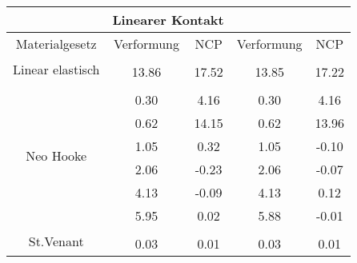 \begin{table} 
\centering 
\begin{tabular}{c|cc|cc|} 
\cline{2-5} 
 & \multicolumn{2}{|c|}{Linearer Kontakt} &  \\ 
\hline 
\multicolumn{1}{|c|}{Materialgesetz} & \multicolumn{1}{c|}{Verformung} & \multicolumn{1}{c|}{NCP} & \multicolumn{1}{c|}{Verformung} & \multicolumn{1}{c|}{NCP} \\ 
\hline 
\multicolumn{1}{|c|}{\multirow{2}{*}{Linear elastisch}} &\multicolumn{1}{|c|}{} & \multicolumn{1}{|c|}{} & \multicolumn{1}{|c|}{} & \multicolumn{1}{|c|}{} \\ 
\multicolumn{1}{|c|}{} & \multicolumn{1}{|c|}{     13.86} & \multicolumn{1}{|c|}{     17.52} & \multicolumn{1}{|c|}{     13.85} & \multicolumn{1}{|c|}{     17.22} \\ 
\hline 
\multicolumn{1}{|c|}{\multirow{7}{*}{Neo Hooke}} &\multicolumn{1}{|c|}{} & \multicolumn{1}{|c|}{} & \multicolumn{1}{|c|}{} & \multicolumn{1}{|c|}{} \\ 
\multicolumn{1}{|c|}{} & \multicolumn{1}{|c|}{      0.30} & \multicolumn{1}{|c|}{      4.16} & \multicolumn{1}{|c|}{      0.30} & \multicolumn{1}{|c|}{      4.16} \\ 
\multicolumn{1}{|c|}{} & \multicolumn{1}{|c|}{      0.62} & \multicolumn{1}{|c|}{     14.15} & \multicolumn{1}{|c|}{      0.62} & \multicolumn{1}{|c|}{     13.96} \\ 
\multicolumn{1}{|c|}{} & \multicolumn{1}{|c|}{      1.05} & \multicolumn{1}{|c|}{      0.32} & \multicolumn{1}{|c|}{      1.05} & \multicolumn{1}{|c|}{     -0.10} \\ 
\multicolumn{1}{|c|}{} & \multicolumn{1}{|c|}{      2.06} & \multicolumn{1}{|c|}{     -0.23} & \multicolumn{1}{|c|}{      2.06} & \multicolumn{1}{|c|}{     -0.07} \\ 
\multicolumn{1}{|c|}{} & \multicolumn{1}{|c|}{      4.13} & \multicolumn{1}{|c|}{     -0.09} & \multicolumn{1}{|c|}{      4.13} & \multicolumn{1}{|c|}{      0.12} \\ 
\multicolumn{1}{|c|}{} & \multicolumn{1}{|c|}{      5.95} & \multicolumn{1}{|c|}{      0.02} & \multicolumn{1}{|c|}{      5.88} & \multicolumn{1}{|c|}{     -0.01} \\ 
\hline 
\multicolumn{1}{|c|}{\multirow{15}{*}{St.Venant}} &\multicolumn{1}{|c|}{} & \multicolumn{1}{|c|}{} & \multicolumn{1}{|c|}{} & \multicolumn{1}{|c|}{} \\ 
\multicolumn{1}{|c|}{} & \multicolumn{1}{|c|}{      0.03} & \multicolumn{1}{|c|}{      0.01} & \multicolumn{1}{|c|}{      0.03} & \multicolumn{1}{|c|}{      0.01} \\ 

\end{tabular}
\end{table}
